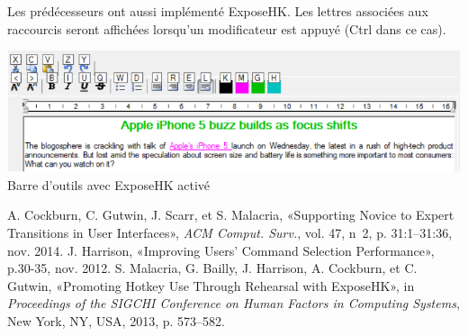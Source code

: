 \documentclass[12pt,a4paper]{article}
\begin{document}
Les prédécesseurs ont aussi implémenté ExposeHK. Les lettres associées aux raccourcis seront affichées lorsqu'un modificateur est appuyé (Ctrl dans ce cas).
\begin{center}
	\includegraphics[width=1\linewidth]{HK.png}
	Barre d'outils avec ExposeHK activé
\end{center}
\newpage
\begin{thebibliography}{10}
	 A. Cockburn, C. Gutwin, J. Scarr, et S. Malacria, «Supporting Novice to Expert
	Transitions in User Interfaces», \textit{ACM Comput. Surv.}, vol. 47, n\textdegree\ 2, p. 31:1–31:36, nov. 2014.
	 J. Harrison, «Improving Users' Command Selection Performance», p.30-35, nov. 2012.
	 S. Malacria, G. Bailly, J. Harrison, A. Cockburn, et C. Gutwin, «Promoting Hotkey Use
	Through Rehearsal with ExposeHK», in \textit{Proceedings of the SIGCHI Conference on Human Factors in Computing Systems}, New York, NY, USA, 2013, p. 573–582.
\end{thebibliography}
\end{document}
